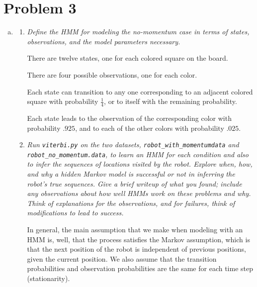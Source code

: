 \documentclass{article}
\begin{document}
\section*{Problem 3}
\begin{enumerate}[(a)]
  \setcounter{enumi}2
\item
  \begin{enumerate}
  \item \emph{Define the HMM for modeling the no-momentum case in terms of
    states, observations, and the model parameters necessary.}

    There are twelve states, one for each colored square on the board.

    There are four possible observations, one for each color.

    Each state can transition to any one corresponding to an adjacent
    colored square with probability $\frac14$, or to itself with the
    remaining probability.

    Each state leads to the observation of the corresponding color
    with probability $.925$, and to each of the other colors with
    probability $.025$.
  \item \emph{Run \emph{\texttt{viterbi.py}} on the two datasets,
    \emph{\texttt{robot\_with\_momentumdata}} and
    \emph{\texttt{robot\_no\_momentum.data}}, to learn an HMM for each
    condition and also to infer the sequences of locations visited by
    the robot. Explore when, how, and why a hidden Markov model is
    successful or not in inferring the robot's true sequences. Give a
    brief writeup of what you found; include any observations about
    how well HMMs work on these problems and why. Think of
    explanations for the observations, and for failures, think of
    modifications to lead to success.}

    In general, the main assumption that we make when modeling with an
    HMM is, well, that the process satisfies the Markov assumption,
    which is that the next position of the robot is independent of
    previous positions, given the current position. We also assume
    that the transition probabilities and observation probabilities
    are the same for each time step (stationarity).


\end{enumerate}
\end{enumerate}
\end{document}
